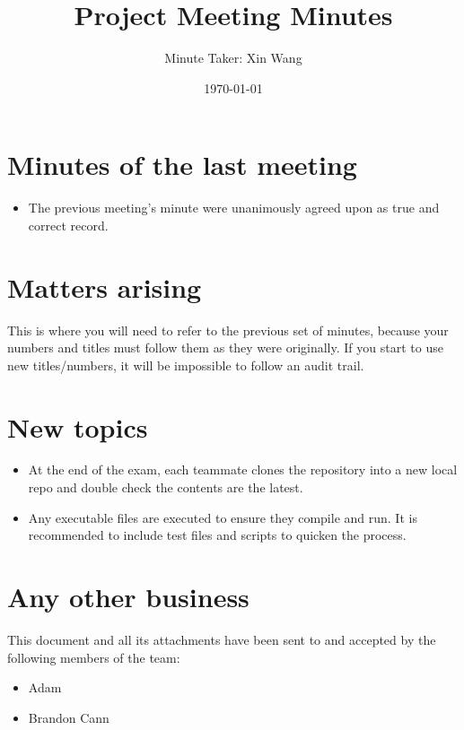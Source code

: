 \documentclass[a4paper]{article}
\author{Minute Taker: Xin Wang}
\title{Project Meeting Minutes}
\date{\today}
\begin{document}
\maketitle
\section{Minutes of the last meeting}
    \begin{itemize}
        \item The previous meeting's minute were unanimously agreed upon as true and correct record.
    \end{itemize}


\maketitle
\section{Matters arising} 
This is where you will need to refer to the previous set of minutes, because your numbers and titles must follow them as they were originally. If you start to use new titles/numbers, it will be impossible to follow an audit trail.


\maketitle
\section{New topics} 
\begin{itemize}
    \item At the end of the exam, each teammate clones the repository into a new local repo and double check the contents are the latest.
    \item Any executable files are executed to ensure they compile and run. It is recommended to include test files and scripts to quicken the process.
\end{itemize}

\maketitle
\section{Any other business} 



\vspace*{\fill}
\begin{center}
This document and all its attachments have been sent to and accepted by the following members of the team:
\begin{itemize}
\item Adam
\item Brandon Cann
\end{itemize}
\end{center}
\end{document}
